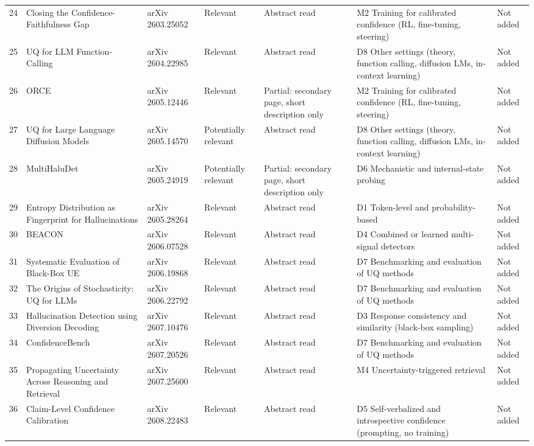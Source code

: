 \documentclass[acmsmall]{acmart}
\begin{document}
\begin{center}
\begin{longtable}{@{}r p{3.0cm} p{2.0cm} p{1.5cm} p{2.3cm} p{2.6cm} p{1.2cm}@{}}
24 & Closing the Confidence-Faithfulness Gap & arXiv 2603.25052 & Relevant & Abstract read & M2 Training for calibrated confidence (RL, fine-tuning, steering) & Not added \\
25 & UQ for LLM Function-Calling & arXiv 2604.22985 & Relevant & Abstract read & D8 Other settings (theory, function calling, diffusion LMs, in-context learning) & Not added \\
26 & ORCE & arXiv 2605.12446 & Relevant & Partial: secondary page, short description only & M2 Training for calibrated confidence (RL, fine-tuning, steering) & Not added \\
27 & UQ for Large Language Diffusion Models & arXiv 2605.14570 & Potentially relevant & Abstract read & D8 Other settings (theory, function calling, diffusion LMs, in-context learning) & Not added \\
28 & MultiHaluDet & arXiv 2605.24919 & Potentially relevant & Partial: secondary page, short description only & D6 Mechanistic and internal-state probing & Not added \\
29 & Entropy Distribution as Fingerprint for Hallucinations & arXiv 2605.28264 & Relevant & Abstract read & D1 Token-level and probability-based & Not added \\
30 & BEACON & arXiv 2606.07528 & Relevant & Abstract read & D4 Combined or learned multi-signal detectors & Not added \\
31 & Systematic Evaluation of Black-Box UE & arXiv 2606.19868 & Relevant & Abstract read & D7 Benchmarking and evaluation of UQ methods & Not added \\
32 & The Origins of Stochasticity: UQ for LLMs & arXiv 2606.22792 & Relevant & Abstract read & D7 Benchmarking and evaluation of UQ methods & Not added \\
33 & Hallucination Detection using Diversion Decoding & arXiv 2607.10476 & Relevant & Abstract read & D3 Response consistency and similarity (black-box sampling) & Not added \\
34 & ConfidenceBench & arXiv 2607.20526 & Relevant & Abstract read & D7 Benchmarking and evaluation of UQ methods & Not added \\
35 & Propagating Uncertainty Across Reasoning and Retrieval & arXiv 2607.25600 & Relevant & Abstract read & M4 Uncertainty-triggered retrieval & Not added \\
36 & Claim-Level Confidence Calibration & arXiv 2608.22483 & Relevant & Abstract read & D5 Self-verbalized and introspective confidence (prompting, no training) & Not added \\

\end{longtable}
\end{center}
\end{document}
